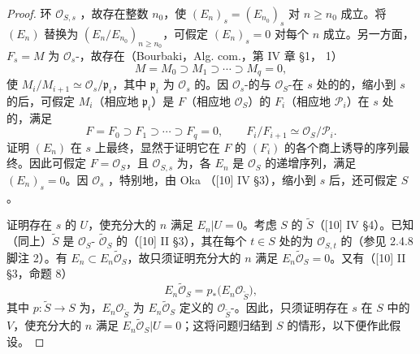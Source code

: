 \begin{proof}
环 $\mathcal O_{S,s}$ ，故存在整数 $n_0$，使 $(E_n)_s=(E_{n_0})_s$ 对 $n\geq n_0$ 成立。将 $(E_n)$ 替换为 $(E_n/E_{n_0})_{n\geq n_0}$，可假定 $(E_n)_s=0$ 对每个 $n$ 成立。另一方面，$F_s=M$ 为 $\mathcal O_s$-，故存在（Bourbaki，Alg. com.，第 IV 章 §1， 1）
\[
M=M_0\supset M_1\supset\cdots\supset M_q=0,
\]
使 $M_i/M_{i+1}\simeq\mathcal O_s/\mathfrak p_i$，其中 $\mathfrak p_i$ 为 $\mathcal O_s$ 的。因 $\mathcal O_s$-的与 $\mathcal O_S$-在 $s$ 处的的，缩小到 $s$ 的后，可假定
$M_i$（相应地 $\mathfrak p_i$）是 $F$（相应地 $\mathcal O_S$）的 $F_i$（相应地 $\mathcal P_i$）在 $s$ 处的，满足
\[
F=F_0\supset F_1\supset\cdots\supset F_q=0,\qquad F_i/F_{i+1}\simeq\mathcal O_S/\mathcal P_i.
\]
证明 $(E_n)$ 在 $s$ 上最终，显然于证明它在 $F$ 的 $(F_i)$ 的各个商上诱导的序列最终。因此可假定 $F=\mathcal O_S$，且 $\mathcal O_{S,s}$ 为，各 $E_n$ 是 $\mathcal O_S$ 的递增序列，满足 $(E_n)_s=0$。因 $\mathcal O_s$ ，特别地，由 Oka （[10] IV §3），缩小到 $s$ 后，还可假定 $S$ 。

证明存在 $s$ 的 $U$，使充分大的 $n$ 满足 $E_n|U=0$。考虑 $S$ 的 $\widetilde S$（[10] IV §4）。已知（同上）$\widetilde S$ 是 $\mathcal O_S$- $\widetilde{\mathcal O}_S$ 的（[10] II §3），其在每个 $t\in S$ 处的为 $\mathcal O_{S,t}$ 的（参见 2.4.8 脚注 2）。有 $E_n\subset E_n\widetilde{\mathcal O}_S$，故只须证明充分大的 $n$ 满足 $E_n\widetilde{\mathcal O}_S=0$。又有（[10] II §3，命题 8）
\[
E_n\widetilde{\mathcal O}_S=p_*\bigl(E_n\mathcal O_{\widetilde S}\bigr),
\]
其中 $p:\widetilde S\to S$ 为，$E_n\mathcal O_{\widetilde S}$ 为 $E_n\widetilde{\mathcal O}_S$ 定义的 $\mathcal O_{\widetilde S}$-。因此，只须证明存在 $s$ 在 $S$ 中的 $V$，使充分大的 $n$ 满足 $E_n\widetilde{\mathcal O}_S|U=0$；这将问题归结到 $S$ 的情形，以下便作此假设。


\end{proof}
